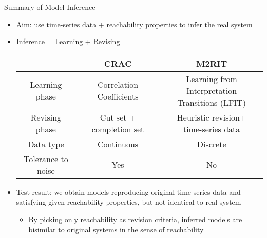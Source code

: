 \documentclass[8pt]{beamer}
\begin{document}
\begin{frame}{Summary of Model Inference}    
\begin{itemize}
\item Aim: use time-series data + reachability properties to infer the real system
\pause
\item Inference = Learning + Revising
\pause
\begin{tabular}{c|c|c}
     &CRAC & M2RIT \\
     \hline
    Learning phase & Correlation Coefficients & \makecell{Learning from Interpretation\\ Transitions (LFIT)}
    \pause\\
     \hline
     Revising phase & \makecell{Cut set +\\ completion set} & \makecell{Heuristic revision+\\time-series data}
     \pause\\
     \hline
     Data type &Continuous & Discrete
     \pause\\
     \hline
     \makecell{Tolerance to\\ noise}&Yes&No
\end{tabular}
\pause
\item Test result: we obtain models reproducing original time-series data and satisfying given reachability properties, but not identical to real system
\pause
\begin{itemize}
    \item By picking only reachability as revision criteria, inferred models are bisimilar to original systems in the sense of reachability
\end{itemize}
\end{itemize}
\end{frame}
\end{document}
